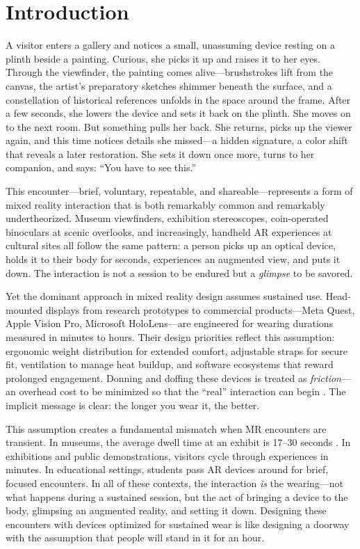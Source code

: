 \section{Introduction}

A visitor enters a gallery and notices a small, unassuming device resting on a plinth beside a painting. Curious, she picks it up and raises it to her eyes. Through the viewfinder, the painting comes alive---brushstrokes lift from the canvas, the artist's preparatory sketches shimmer beneath the surface, and a constellation of historical references unfolds in the space around the frame. After a few seconds, she lowers the device and sets it back on the plinth. She moves on to the next room. But something pulls her back. She returns, picks up the viewer again, and this time notices details she missed---a hidden signature, a color shift that reveals a later restoration. She sets it down once more, turns to her companion, and says: ``You have to see this.''

This encounter---brief, voluntary, repeatable, and shareable---represents a form of mixed reality interaction that is both remarkably common and remarkably undertheorized. Museum viewfinders, exhibition stereoscopes, coin-operated binoculars at scenic overlooks, and increasingly, handheld AR experiences at cultural sites all follow the same pattern: a person picks up an optical device, holds it to their body for seconds, experiences an augmented view, and puts it down. The interaction is not a session to be endured but a \textit{glimpse} to be savored.

Yet the dominant approach in mixed reality design assumes sustained use. Head-mounted displays from research prototypes to commercial products---Meta Quest, Apple Vision Pro, Microsoft HoloLens---are engineered for wearing durations measured in minutes to hours. Their design priorities reflect this assumption: ergonomic weight distribution for extended comfort, adjustable straps for secure fit, ventilation to manage heat buildup, and software ecosystems that reward prolonged engagement. Donning and doffing these devices is treated as \textit{friction}---an overhead cost to be minimized so that the ``real'' interaction can begin \cite{knight2006comfort}. The implicit message is clear: the longer you wear it, the better.

This assumption creates a fundamental mismatch when MR encounters are transient. In museums, the average dwell time at an exhibit is 17--30 seconds \cite{vomlehn2001exhibiting}. In exhibitions and public demonstrations, visitors cycle through experiences in minutes. In educational settings, students pass AR devices around for brief, focused encounters. In all of these contexts, the interaction \textit{is} the wearing---not what happens during a sustained session, but the act of bringing a device to the body, glimpsing an augmented reality, and setting it down. Designing these encounters with devices optimized for sustained wear is like designing a doorway with the assumption that people will stand in it for an hour.


